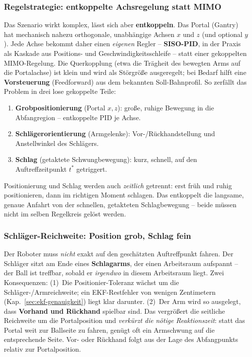 \subsubsection{Regelstrategie: entkoppelte Achsregelung statt MIMO}
Das Szenario wirkt komplex, lässt sich aber \textbf{entkoppeln}. Das Portal
(Gantry) hat mechanisch nahezu orthogonale, unabhängige Achsen $x$ und $z$ (und
optional $y$). Jede Achse bekommt daher einen \emph{eigenen} Regler --
\textbf{SISO-PID}, in der Praxis als Kaskade aus Positions- und
Geschwindigkeitsschleife -- statt einer gekoppelten MIMO-Regelung. Die
Querkopplung (etwa die Trägheit des bewegten Arms auf die Portalachse) ist klein
und wird als Störgröße ausgeregelt; bei Bedarf hilft eine \textbf{Vorsteuerung}
(Feedforward) aus dem bekannten Soll-Bahnprofil. So zerfällt das Problem in drei
lose gekoppelte Teile:
\begin{enumerate}
\item \textbf{Grobpositionierung} (Portal $x,z$): große, ruhige Bewegung in die
  Abfangregion -- entkoppelte PID je Achse.
\item \textbf{Schlägerorientierung} (Armgelenke): Vor-/Rückhandstellung und
  Anstellwinkel des Schlägers.
\item \textbf{Schlag} (getaktete Schwungbewegung): kurz, schnell, auf den
  Auftreffzeitpunkt $t^\ast$ getriggert.
\end{enumerate}
Positionierung und Schlag werden auch \emph{zeitlich} getrennt: erst früh und ruhig
positionieren, dann im richtigen Moment schlagen. Das entkoppelt die langsame,
genaue Anfahrt von der schnellen, getakteten Schlagbewegung -- beide müssen nicht
im selben Regelkreis gelöst werden.

\subsubsection{Schläger-Reichweite: Position grob, Schlag fein}
Der Roboter muss \emph{nicht} exakt auf den geschätzten Auftreffpunkt fahren. Der
Schläger sitzt am Ende eines \textbf{Schlagarms}, der einen Arbeitsraum aufspannt --
der Ball ist treffbar, sobald er \emph{irgendwo} in diesem Arbeitsraum liegt. Zwei
Konsequenzen: (1)~Die Positionier-Toleranz wächst um die Schläger-/Armreichweite;
ein EKF-Restfehler von wenigen Zentimetern (Kap.~\ref{sec:ekf-genauigkeit}) liegt
klar darunter. (2)~Der Arm wird so ausgelegt, dass \textbf{Vorhand und Rückhand}
spielbar sind. Das vergrößert die seitliche Reichweite um die Portalposition und
\emph{verkürzt die nötige Reaktionszeit}: statt das Portal weit zur Ballseite zu
fahren, genügt oft ein Armschwung auf die entsprechende Seite. Vor- oder Rückhand
folgt aus der Lage des Abfangpunkts relativ zur Portalposition.

